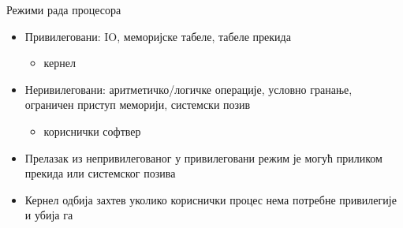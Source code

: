 \documentclass[xcolor=table]{beamer}
\begin{document}
    \begin{frame}{Режими рада процесора}
        \begin{itemize}
            \item Привилеговани: IO, меморијске табеле, табеле прекида
            \begin{itemize}
                \item кернел
            \end{itemize}
            \item Неривилеговани: аритметичко/логичке операције, условно гранање, ограничен приступ меморији, системски позив
            \begin{itemize}
                \item кориснички софтвер
            \end{itemize}
            \item Прелазак из непривилегованог у привилеговани режим је могућ приликом прекида или системског позива
            \item Кернел одбија захтев уколико кориснички процес нема потребне привилегије и убија га
        \end{itemize}
    \end{frame}
    
\end{document}
